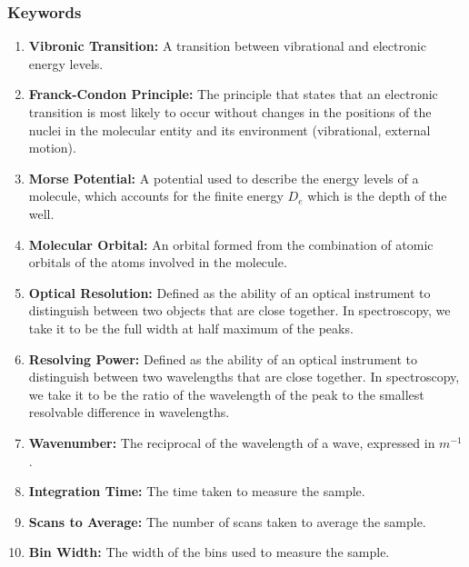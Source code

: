 \documentclass{article}
\begin{document}
\subsubsection{Keywords}
\begin{enumerate}
    \item \textbf{Vibronic Transition:} A transition between vibrational and electronic energy levels.
    
    \item \textbf{Franck-Condon Principle:} The principle that states that an electronic transition is most likely to occur without changes in the positions of the nuclei in the molecular entity and its environment (vibrational, external motion)\cite{MolecularSpectroscopy}.
    
    \item \textbf{Morse Potential:} A potential used to describe the energy levels of a molecule, which accounts for the finite energy $D_e$ which is the depth of the well.
    
    \item \textbf{Molecular Orbital:} An orbital formed from the combination of atomic orbitals of the atoms involved in the molecule.
    
    \item \textbf{Optical Resolution:} Defined as the ability of an optical instrument to distinguish between two objects that are close together. In spectroscopy, we take it to be the full width at half maximum of the peaks.
    
    \item \textbf{Resolving Power:} Defined as the ability of an optical instrument to distinguish between two wavelengths that are close together. In spectroscopy, we take it to be the ratio of the wavelength of the peak to the smallest resolvable difference in wavelengths.
    
    \item \textbf{Wavenumber:} The reciprocal of the wavelength of a wave, expressed in $m^{-1}$.
    
    \item \label{kew:int_time}\textbf{Integration Time:} The time taken to measure the sample.
    
    \item \label{kew:s_t_a}\textbf{Scans to Average:} The number of scans taken to average the sample.
    
    \item \label{kew:binwidth}\textbf{Bin Width:} The width of the bins used to measure the sample.
    

\end{enumerate}
\end{document}
